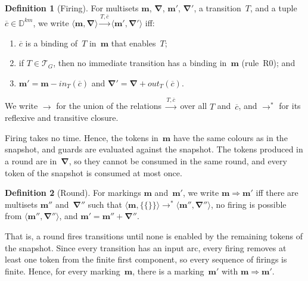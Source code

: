 \documentclass[11pt]{article}
\theoremstyle{definition}
\newcommand{\Dom}{\mathbb{D}}
\newcommand{\mset}[1]{\{\!\{#1\}\!\}}
\newcommand{\cvec}{\overline{c}}
\newcommand{\bfm}{\mathbf{m}}
\newcommand{\bfNabla}{\boldsymbol{\nabla}}
\newtheorem{definition}{Definition}
\begin{document}
\begin{definition}[Firing]\label{def:firing}
  For multisets $\bfm$, $\bfNabla$, $\bfm'$, $\bfNabla'$, a
  transition~$T$, and a tuple $\cvec \in \Dom^{km}$, we write
  $\langle \bfm, \bfNabla \rangle \xrightarrow{T, \cvec}
    \langle \bfm', \bfNabla' \rangle$ iff:
  \begin{enumerate}
    \item $\cvec$ is a binding of~$T$ in~$\bfm$ that enables~$T$;
    \item if $T \in \mathcal{T}_G$, then no immediate transition has a
      binding in~$\bfm$ (rule~R0); and
    \item $\bfm' = \bfm - \mathit{in}_T(\cvec)$ and
      $\bfNabla' = \bfNabla + \mathit{out}_T(\cvec)$.
  \end{enumerate}
  We write $\rightarrow$ for the union of the relations
  $\xrightarrow{T, \cvec}$ over all $T$ and~$\cvec$, and $\rightarrow^*$ for
  its reflexive and transitive closure.
\end{definition}

Firing takes no time. Hence, the tokens in~$\bfm$ have the same colours as in
the snapshot, and guards are evaluated against the snapshot. The tokens
produced in a round are in~$\bfNabla$, so they cannot be consumed in the same
round, and every token of the snapshot is consumed at most once.

\begin{definition}[Round]\label{def:round}
  For markings $\bfm$ and~$\bfm'$, we write $\bfm \Rightarrow \bfm'$ iff
  there are multisets $\bfm''$ and~$\bfNabla''$ such that
  $\langle \bfm, \mset{} \rangle \rightarrow^* \langle \bfm'', \bfNabla''
  \rangle$, no firing is possible from
  $\langle \bfm'', \bfNabla'' \rangle$, and
  $\bfm' = \bfm'' + \bfNabla''$.
\end{definition}

That is, a round fires transitions until none is enabled by the remaining
tokens of the snapshot. Since every transition has an input arc, every firing
removes at least one token from the finite first component, so every sequence
of firings is finite. Hence, for every
marking~$\bfm$, there is a marking~$\bfm'$ with $\bfm \Rightarrow \bfm'$.
\end{document}
